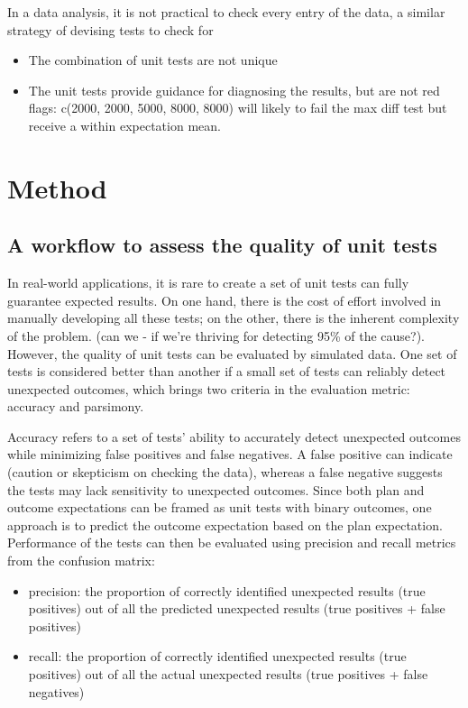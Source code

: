 \documentclass[
]{jds}
\providecommand{\tightlist}{%
  \setlength{\itemsep}{0pt}\setlength{\parskip}{0pt}}\usepackage{longtable,booktabs,array}
\begin{document}
In a data analysis, it is not practical to check every entry of the
data, a similar strategy of devising tests to check for

\begin{itemize}
\tightlist
\item
  The combination of unit tests are not unique
\item
  The unit tests provide guidance for diagnosing the results, but are
  not red flags: c(2000, 2000, 5000, 8000, 8000) will likely to fail the
  max diff test but receive a within expectation mean.
\end{itemize}

\section{Method}\label{method}

\subsection{A workflow to assess the quality of unit
tests}\label{a-workflow-to-assess-the-quality-of-unit-tests}

In real-world applications, it is rare to create a set of unit tests can
fully guarantee expected results. On one hand, there is the cost of
effort involved in manually developing all these tests; on the other,
there is the inherent complexity of the problem. (can we - if we're
thriving for detecting 95\% of the cause?). However, the quality of unit
tests can be evaluated by simulated data. One set of tests is considered
better than another if a small set of tests can reliably detect
unexpected outcomes, which brings two criteria in the evaluation metric:
accuracy and parsimony.

Accuracy refers to a set of tests' ability to accurately detect
unexpected outcomes while minimizing false positives and false
negatives. A false positive can indicate (caution or skepticism on
checking the data), whereas a false negative suggests the tests may lack
sensitivity to unexpected outcomes. Since both plan and outcome
expectations can be framed as unit tests with binary outcomes, one
approach is to predict the outcome expectation based on the plan
expectation. Performance of the tests can then be evaluated using
precision and recall metrics from the confusion matrix:

\begin{itemize}
\tightlist
\item
  precision: the proportion of correctly identified unexpected results
  (true positives) out of all the predicted unexpected results (true
  positives + false positives)
\item
  recall: the proportion of correctly identified unexpected results
  (true positives) out of all the actual unexpected results (true
  positives + false negatives)
\end{itemize}
\end{document}
